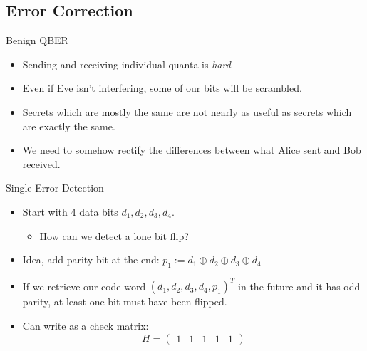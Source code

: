 \documentclass[pdf]{beamer}
\begin{document}
\subsection{Error Correction}
\begin{frame}{Benign QBER}
  \begin{itemize}
  \item Sending and receiving individual quanta is \emph{hard}
  \item Even if Eve isn't interfering, some of our bits will be scrambled.
  \item Secrets which are mostly the same are not nearly as useful as secrets which are
    exactly the same.
  \item We need to somehow rectify the differences between what Alice sent and
    Bob received.
  \end{itemize}
\end{frame}
\begin{frame}{Single Error Detection}
  \begin{itemize}
  \item Start with 4 data bits $d_1,d_2,d_3,d_4$.
    \begin{itemize}
    \item How can we detect a lone bit flip?
    \end{itemize}
  \item Idea, add parity bit at the end: $p_1 := d_1 \oplus d_2 \oplus d_3 \oplus d_4$
  \item If we retrieve our code word $(d_1,d_2,d_3,d_4,p_1)^T$ in the future and
    it has odd parity, at least one bit must have been flipped.
  \item Can write as a check matrix: \[ H = \begin{pmatrix}
        1 & 1 & 1 & 1 & 1
      \end{pmatrix} \]
  \end{itemize}
\end{frame}
\end{document}
